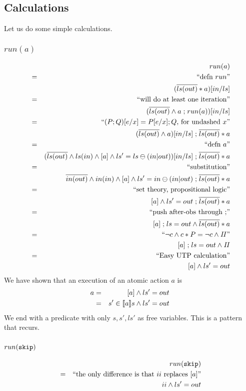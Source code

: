 \subsection{Calculations}

Let us do some simple calculations.

\subsubsection{$run(a)$}

\begin{eqnarray*}
  && run(a)
\\&=&\textrm{``defn $run$''}
\\&& ( \overline{ls(out)} * a)[in/ls]
\\&=&\textrm{``will do at least one iteration''}
\\&& (\overline{ls(out)} \land a \mathrel{;} run(a))[in/ls]
\\&=&\textrm{``$(P;Q)[e/x] = P[e/x];Q$, for undashed $x$''}
\\&& (\overline{ls(out)} \land a) [in/ls] \mathrel{;} \overline{ls(out)} * a
\\&=&\textrm{``defn $a$''}
\\&& (\overline{ls(out)}
      \land ls(in) \land [a] \land ls'=ls \ominus (in|out))
      [in/ls]
      \mathrel{;} \overline{ls(out)} * a
\\&=&\textrm{``substitution''}
\\&& \overline{in(out)}
      \land in(in) \land [a] \land ls'=in \ominus (in|out)
      \mathrel{;} \overline{ls(out)} * a
\\&=&\textrm{``set theory, propositional logic''}
\\&& [a] \land ls'=out \mathrel{;} \overline{ls(out)} * a
\\&=&\textrm{``push after-obs through $\mathrel{;}$''}
\\&& [a] \mathrel{;}  ls=out \land \overline{ls(out)} * a
\\&=&\textrm{``$\lnot c \land c*P = \lnot c \land \mathit{II}$''}
\\&& [a] \mathrel{;}  ls=out \land \mathit{II}
\\&=&\textrm{``Easy UTP calculation''}
\\&& [a] \land  ls'=out
\end{eqnarray*}
We have shown that
an execution of an atomic action $a$ is
\begin{eqnarray*}
   a &=& [a] \land  ls'=out
\\   &=& s' \in [\![{a}]\!] s \land ls'=out
\end{eqnarray*}
We end with a predicate with only $s,s',ls'$ as free variables.
This is a pattern that recurs.

\subsubsection{$run(\texttt{skip})$}

\begin{eqnarray*}
  && run(\texttt{skip})
\\&=&\textrm{``the only difference is that $ii$ replaces $[a]$''}
\\&& ii \land  ls'=out
\end{eqnarray*}

